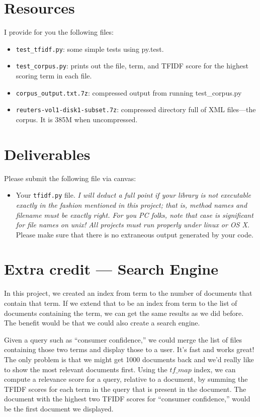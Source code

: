 \begin{fullwidth}
\section{Resources}

I provide for you the following files:

\begin{itemize}
\item {\tt test\_tfidf.py}: some simple tests using py.test.
\item {\tt test\_corpus.py}: prints out the file, term, and TFIDF score for the highest scoring term in each file.
\item {\tt corpus\_output.txt.7z}: compressed output from running test\_corpus.py
\item {\tt reuters-vol1-disk1-subset.7z}: compressed directory full of XML files---the corpus. It is 385M when uncompressed.
\end{itemize}

\section{Deliverables}

\noindent Please submit the following file via canvas:

\begin{itemize}
\item Your {\tt tfidf.py} file. {\em I will deduct a full point if your library is not executable exactly in the fashion mentioned in this project; that is, method names and filename must be exactly right. For you PC folks, note that case is significant for file names on unix! All projects must run properly under linux or OS X.} Please make sure that there is no extraneous output generated by your code.
\end{itemize}

\section{Extra credit --- Search Engine}

In this project, we created an index from term to the number of documents that contain that term. If we extend that to be an index from term to the list of documents containing the term, we can get the same results as we did before. The benefit would be that we could also create a search engine.

Given a query such as ``consumer confidence,'' we could merge the list of files containing those two terms and display those to a user. It's fast and works great! The only problem is that we might get 1000 documents back and we'd really like to show the most relevant documents first.  Using the $tf\_map$ index, we can compute a relevance score for a query, relative to a document, by summing the TFIDF scores for each term in the query that is present in the document. The document with the highest two TFIDF scores for ``consumer confidence,'' would be the first document we displayed.


\end{fullwidth}
